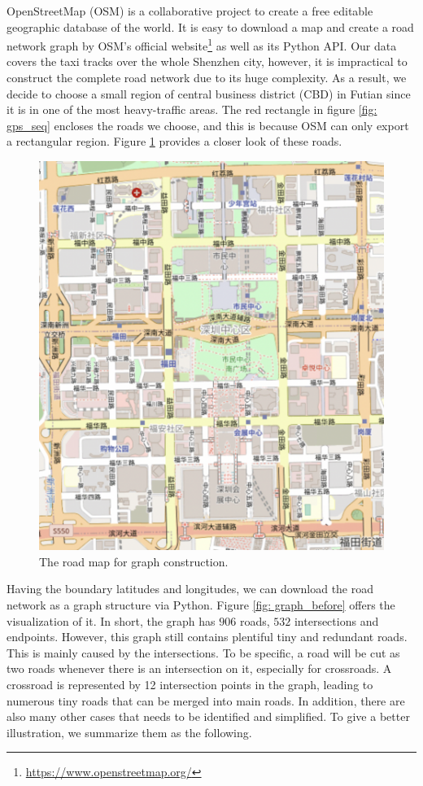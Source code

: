 OpenStreetMap (OSM)\cite{osm} is a collaborative project to create a free editable geographic database of the world. It is easy to download a map and create a road network graph by OSM's official website\footnote{\href{https://www.openstreetmap.org/}{https://www.openstreetmap.org/}} as well as its Python API. Our data covers the taxi tracks over the whole Shenzhen city, however, it is impractical to construct the complete road network due to its huge complexity. As a result, we decide to choose a small region of central business district (CBD) in Futian since it is in one of the most heavy-traffic areas. The red rectangle in figure \ref{fig: gps_seq} encloses the roads we choose, and this is because OSM can only export a rectangular region. Figure \ref{fig: roadmap} provides a closer look of these roads.
\clearpage %
\begin{figure}[htb]
  \centering
  \includegraphics[width=\textwidth]{images/roadmap.png}
  \caption{The road map for graph construction.}
  \label{fig: roadmap}
\end{figure}

Having the boundary latitudes and longitudes, we can download the road network as a graph structure via Python. Figure \ref{fig: graph_before} offers the visualization of it. In short, the graph has $906$ roads, $532$ intersections and endpoints. However, this graph still contains plentiful tiny and redundant roads. This is mainly caused by the intersections\cite{graph_simplify}. To be specific, a road will be cut as two roads whenever there is an intersection on it, especially for crossroads. A crossroad is represented by 12 intersection points in the graph, leading to numerous tiny roads that can be merged into main roads. In addition, there are also many other cases that needs to be identified and simplified. To give a better illustration, we summarize them as the following.

